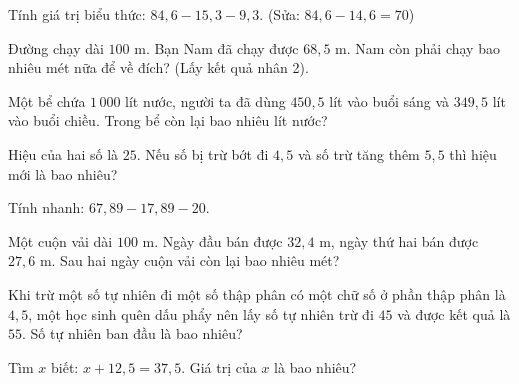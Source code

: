 \begin{ex}
  Tính giá trị biểu thức: $84{,}6 - 15{,}3 - 9{,}3$. (Sửa: $84{,}6 - 14{,}6 = 70$)
\end{ex}

\begin{ex}
  Đường chạy dài $100\text{ m}$. Bạn Nam đã chạy được $68{,}5\text{ m}$. Nam còn phải chạy bao nhiêu mét nữa để về đích? (Lấy kết quả nhân 2).
\end{ex}

\begin{ex}
  Một bể chứa $1\,000$ lít nước, người ta đã dùng $450{,}5$ lít vào buổi sáng và $349{,}5$ lít vào buổi chiều. Trong bể còn lại bao nhiêu lít nước?
\end{ex}

\begin{ex}
  Hiệu của hai số là $25$. Nếu số bị trừ bớt đi $4{,}5$ và số trừ tăng thêm $5{,}5$ thì hiệu mới là bao nhiêu?
\end{ex}

\begin{ex}
  Tính nhanh: $67{,}89 - 17{,}89 - 20$.
\end{ex}

\begin{ex}
  Một cuộn vải dài $100\text{ m}$. Ngày đầu bán được $32{,}4\text{ m}$, ngày thứ hai bán được $27{,}6\text{ m}$. Sau hai ngày cuộn vải còn lại bao nhiêu mét?
\end{ex}

\begin{ex}
  Khi trừ một số tự nhiên đi một số thập phân có một chữ số ở phần thập phân là $4{,}5$, một học sinh quên dấu phẩy nên lấy số tự nhiên trừ đi $45$ và được kết quả là $55$. Số tự nhiên ban đầu là bao nhiêu?
\end{ex}

\begin{ex}
  Tìm $x$ biết: $x + 12{,}5 = 37{,}5$. Giá trị của $x$ là bao nhiêu?
\end{ex}
